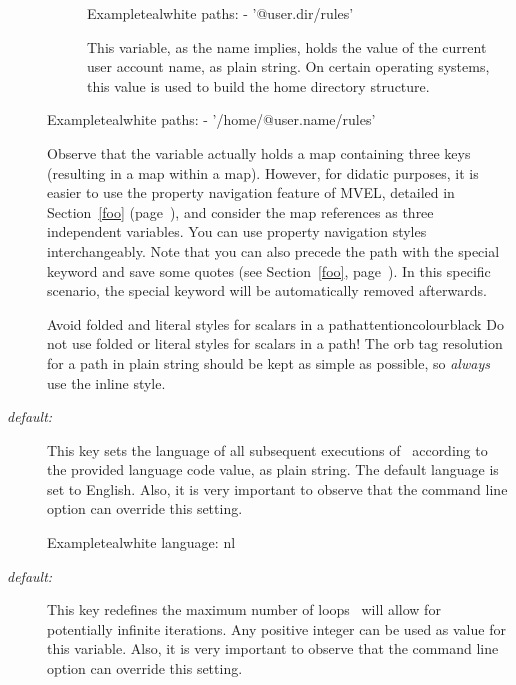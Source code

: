 \begin{description}
\begin{description}
\begin{codebox}{Example}{teal}{\icnote}{white}
paths:
- '@{user.dir}/rules'
\end{codebox}

\item[\varbox{user.name}] This variable, as the name implies, holds the value of the current user account name, as plain string. On certain operating systems, this value is used to build the home directory structure.
\end{description}

\begin{codebox}{Example}{teal}{\icnote}{white}
paths:
- '/home/@{user.name}/rules'
\end{codebox}

Observe that the  variable actually holds a map containing three keys (resulting in a map within a map). However, for didatic purposes, it is easier to use the property navigation feature of MVEL, detailed in Section~\ref{foo} (page~\pageref{foo}), and consider the map references as three independent variables. You can use property navigation styles interchangeably. Note that you can also precede the path with the special keyword  and save some quotes (see Section~\ref{foo}, page~\pageref{foo}). In this specific scenario, the special keyword will be automatically removed afterwards.

\begin{messagebox}{Avoid folded and literal styles for scalars in a path}{attentioncolour}{\icattention}{black}
Do not use folded or literal styles for scalars in a path! The orb tag resolution for a path in plain string should be kept as simple as possible, so \emph{always} use the inline style.
\end{messagebox}

\item[\describecf{O}{string}{language}\hfill {\normalfont\itshape default:} \rbox{en}] This key sets the language of all subsequent executions of \arara\ according to the provided language code value, as plain string. The default language is set to English. Also, it is very important to observe that the  command line option can override this setting.

\begin{codebox}{Example}{teal}{\icnote}{white}
language: nl
\end{codebox}

\item[\describecf{O}{integer}{loops}\hfill {\normalfont\itshape default:} \rbox{10}] This key redefines the maximum number of loops \arara\ will allow for potentially infinite iterations. Any positive integer can be used as value for this variable. Also, it is very important to observe that the  command line option can override this setting.


\end{description}
